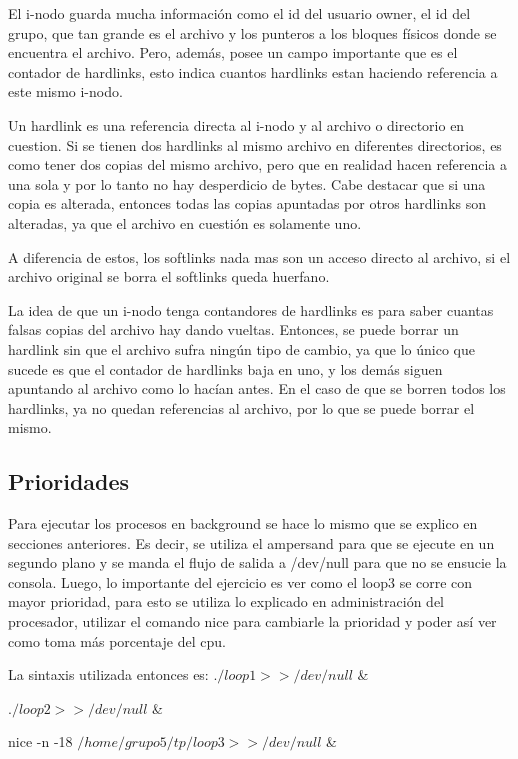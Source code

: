 \documentclass[a4paper, 12pt]{article}
\begin{document}
El i-nodo guarda mucha informaci\'on como el id del usuario owner, el id del grupo, que tan grande es el archivo y los punteros a los bloques f\'isicos donde se encuentra el archivo. Pero, adem\'as, posee un campo importante que es el contador de hardlinks, esto indica cuantos hardlinks estan haciendo referencia a este mismo i-nodo. 


Un hardlink es una referencia directa al i-nodo y al archivo o directorio en cuestion. Si se tienen dos hardlinks al mismo archivo en diferentes directorios, es como tener dos copias del mismo archivo, pero que en realidad hacen referencia a una sola y por lo tanto no hay desperdicio de bytes. Cabe destacar que si una copia es alterada, entonces todas las copias apuntadas por otros hardlinks son alteradas, ya que el archivo en cuesti\'on es solamente uno. 

A diferencia de estos, los softlinks nada mas son un acceso directo al archivo, si el archivo original se borra el softlinks queda huerfano.

La idea de que un i-nodo tenga contandores de hardlinks es para saber cuantas falsas copias del archivo hay dando vueltas. Entonces, se puede borrar un hardlink sin que el archivo sufra ning\'un tipo de cambio, ya que lo \'unico que sucede es que el contador de hardlinks baja en uno, y los dem\'as siguen apuntando al archivo como lo hac\'ian antes. En el caso de que se borren todos los hardlinks, ya no quedan referencias al archivo, por lo que se puede borrar el mismo. 


\subsection*{Prioridades}

Para ejecutar los procesos en background se hace lo mismo que se explico en secciones anteriores. Es decir, se utiliza el ampersand para que se ejecute en un segundo plano y se manda el flujo de salida a /dev/null para que no se ensucie la consola. Luego, lo importante del ejercicio es ver como el loop3 se corre con mayor prioridad, para esto se utiliza lo explicado en administraci\'on del procesador, utilizar el comando nice para cambiarle la prioridad y poder as\'i ver como toma m\'as porcentaje del cpu.

La sintaxis utilizada entonces es:
$./loop1 >> /dev/null$ \&

$./loop2 >> /dev/null$ \&

nice -n -18 $/home/grupo5/tp/loop3 >> /dev/null$ \&
\end{document}
